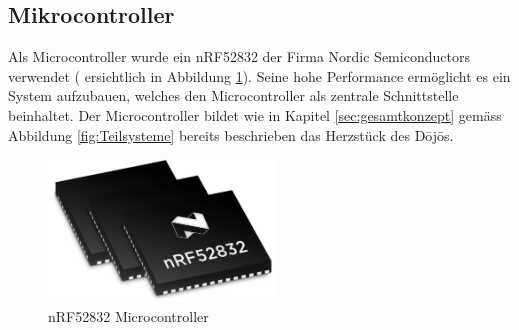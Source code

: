 \subsection{Mikrocontroller} \label{sec:microcontrollerHardware}

Als Microcontroller wurde ein nRF52832 der Firma Nordic Semiconductors verwendet ( ersichtlich in Abbildung \ref{fig:nRF52832}). Seine hohe Performance ermöglicht es ein System aufzubauen, welches den Microcontroller als zentrale Schnittstelle beinhaltet. Der Microcontroller bildet wie in Kapitel \ref{sec:gesamtkonzept} gemäss Abbildung \ref{fig:Teilsysteme} bereits beschrieben das Herzstück des Dōjōs. 

\begin{figure}[H]
	\begin{center}
		\includegraphics[width=60mm]{data/nRF52832.png}
		\caption[nRF52832 Microcontroller]{nRF52832 Microcontroller \cite{nRF52832}} %
		\label{fig:nRF52832}
	\end{center}
\end{figure}

